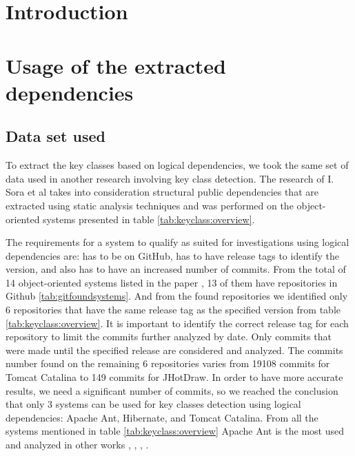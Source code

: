 \documentclass[12pt]{mitthesis}
\begin{document}


\tableofcontents

\pagestyle{plain}

\chapter{Introduction}
\chapter{Usage of the extracted dependencies}
\section{Data set used}
To extract the key classes based on logical dependencies, we took the same set of data used in another research involving key class detection. The research of I. Sora et al \cite{Finding-key-classes} takes into consideration structural public dependencies that are extracted using static analysis techniques and was performed on the object-oriented systems presented in table \ref{tab:keyclass:overview}.

The requirements for a system to qualify as suited for investigations using logical dependencies are: has to be on GitHub, has to have release tags to identify the version, and also has to have an increased number of commits. 
From the total of 14 object-oriented systems listed in the paper \cite{Finding-key-classes}, 13 of them have repositories in Github \ref{tab:gitfoundsystems}. And from the found repositories we identified only 6 repositories that have the same release tag as the specified version from table \ref{tab:keyclass:overview}. It is important to identify the correct release tag for each repository to limit the commits further analyzed by date. Only commits that were made until the specified release are considered and analyzed.
The commits number found on the remaining 6 repositories varies from 19108 commits for Tomcat Catalina to 149 commits for JHotDraw. In order to have more accurate results, we need a significant number of commits, so we reached the conclusion that only 3 systems can be used for key classes detection using logical dependencies: Apache Ant, Hibernate, and Tomcat Catalina.  From all the systems mentioned in table \ref{tab:keyclass:overview} Apache Ant is the most used and analyzed in other  works \cite{enase19}, \cite{7332515}, \cite{1402122}, \cite{Kamran2016IdentificationOC}.
\end{document}
